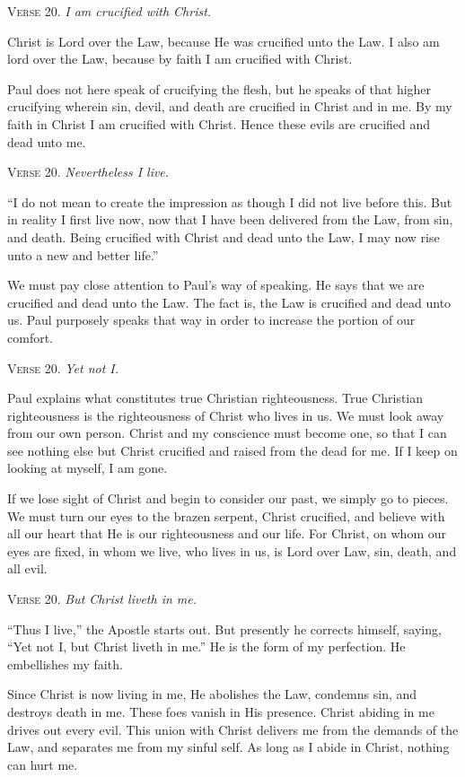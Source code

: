\textsc{Verse} 20. \emph{I am crucified with Christ.}

Christ is Lord over the Law, because He was crucified unto the Law. I also am lord over the Law, because by faith I am crucified with Christ.

Paul does not here speak of crucifying the flesh, but he speaks of that higher crucifying wherein sin, devil, and death are crucified in Christ and in me. By my faith in Christ I am crucified with Christ. Hence these evils are crucified and dead unto me.

\textsc{Verse} 20. \emph{Nevertheless I live.}

“I do not mean to create the impression as though I did not live before this. But in reality I first live now, now that I have been delivered from the Law, from sin, and death. Being crucified with Christ and dead unto the Law, I may now rise unto a new and better life.”

We must pay close attention to Paul’s way of speaking. He says that we are crucified and dead unto the Law. The fact is, the Law is crucified and dead unto us. Paul purposely speaks that way in order to increase the portion of our comfort.

\textsc{Verse} 20. \emph{Yet not I.}

Paul explains what constitutes true Christian righteousness. True Christian righteousness is the righteousness of Christ who lives in us. We must look away from our own person. Christ and my conscience must become one, so that I can see nothing else but Christ crucified and raised from the dead for me. If I keep on looking at myself, I am gone.

If we lose sight of Christ and begin to consider our past, we simply go to pieces. We must turn our eyes to the brazen serpent, Christ crucified, and believe with all our heart that He is our righteousness and our life. For Christ, on whom our eyes are fixed, in whom we live, who lives in us, is Lord over Law, sin, death, and all evil.

\textsc{Verse} 20. \emph{But Christ liveth in me.}

“Thus I live,” the Apostle starts out. But presently he corrects himself, saying, “Yet not I, but Christ liveth in me.” He is the form of my perfection. He embellishes my faith.

Since Christ is now living in me, He abolishes the Law, condemns sin, and destroys death in me. These foes vanish in His presence. Christ abiding in me drives out every evil. This union with Christ delivers me from the demands of the Law, and separates me from my sinful self. As long as I abide in Christ, nothing can hurt me.

